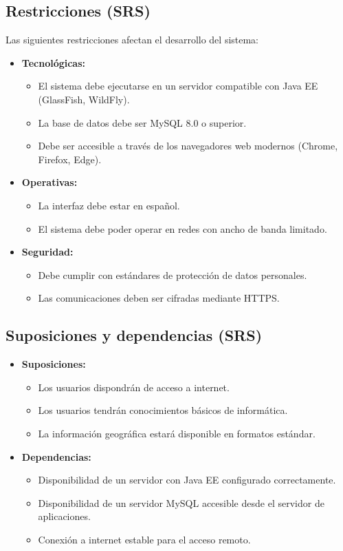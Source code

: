 \subsection{Restricciones (SRS)}
\label{srs:restricciones}
Las siguientes restricciones afectan el desarrollo del sistema:
\begin{itemize}
\item \textbf{Tecnológicas:}
  \begin{itemize}
  \item El sistema debe ejecutarse en un servidor compatible con Java EE (GlassFish, WildFly).
  \item La base de datos debe ser MySQL 8.0 o superior.
  \item Debe ser accesible a través de los navegadores web modernos (Chrome, Firefox, Edge).
  \end{itemize}
\item \textbf{Operativas:}
  \begin{itemize}
  \item La interfaz debe estar en español.
  \item El sistema debe poder operar en redes con ancho de banda limitado.
  \end{itemize}
\item \textbf{Seguridad:}
  \begin{itemize}
  \item Debe cumplir con estándares de protección de datos personales.
  \item Las comunicaciones deben ser cifradas mediante HTTPS.
  \end{itemize}
\end{itemize}

\subsection{Suposiciones y dependencias (SRS)}
\label{srs:suposiciones}
\begin{itemize}
\item \textbf{Suposiciones:}
  \begin{itemize}
  \item Los usuarios dispondrán de acceso a internet.
  \item Los usuarios tendrán conocimientos básicos de informática.
  \item La información geográfica estará disponible en formatos estándar.
  \end{itemize}
\item \textbf{Dependencias:}
  \begin{itemize}
  \item Disponibilidad de un servidor con Java EE configurado correctamente.
  \item Disponibilidad de un servidor MySQL accesible desde el servidor de aplicaciones.
  \item Conexión a internet estable para el acceso remoto.
  \end{itemize}
\end{itemize}

